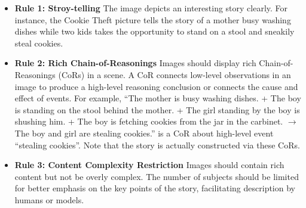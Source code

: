 \begin{itemize}
    \item \textbf{Rule 1: Stroy-telling} The image depicts an interesting story clearly. For instance, the Cookie Theft picture tells the story of a mother busy washing dishes while two kids takes the opportunity to stand on a stool and sneakily steal cookies. 
    \item \textbf{Rule 2: Rich Chain-of-Reasonings} Images should display rich Chain-of-Reasonings (CoRs) in a scene. 
    A CoR connects low-level observations in an image to produce a high-level reasoning conclusion or connects the cause and effect of events. 
    For example, ``The mother is busy washing dishes. + The boy is standing on the stool behind the mother. + The girl standing by the boy is shushing him. + The boy is fetching cookies from the jar in the carbinet. $\rightarrow$ The boy and girl are stealing cookies.'' is a CoR about high-level event ``stealing cookies''. Note that the story is actually constructed via these CoRs.
    \item \textbf{Rule 3: Content Complexity Restriction} Images should contain rich content but not be overly complex. The number of subjects should be limited for better emphasis on the key points of the story, facilitating description by humans or models. 
\end{itemize}

